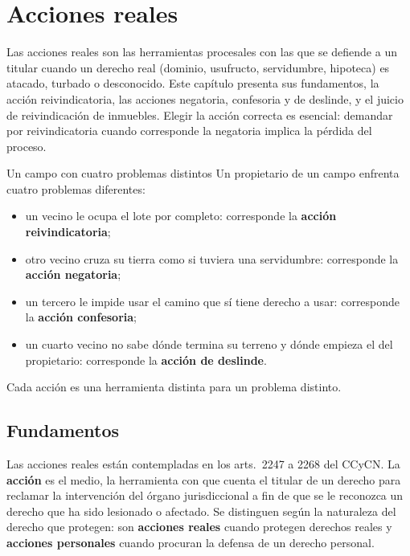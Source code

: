 \documentclass[12pt,oneside]{book}
\begin{document}
\chapter{Acciones reales}\label{cap:reales}

Las acciones reales son las herramientas procesales con las que se defiende a un titular cuando un derecho real (dominio, usufructo, servidumbre, hipoteca) es atacado, turbado o desconocido. Este capítulo presenta sus fundamentos, la acción reivindicatoria, las acciones negatoria, confesoria y de deslinde, y el juicio de reivindicación de inmuebles. Elegir la acción correcta es esencial: demandar por reivindicatoria cuando corresponde la negatoria implica la pérdida del proceso.

\begin{ejemplo}{Un campo con cuatro problemas distintos}
Un propietario de un campo enfrenta cuatro problemas diferentes:
\begin{itemize}
    \item un vecino le ocupa el lote por completo: corresponde la \textbf{acción reivindicatoria};
    \item otro vecino cruza su tierra como si tuviera una servidumbre: corresponde la \textbf{acción negatoria};
    \item un tercero le impide usar el camino que sí tiene derecho a usar: corresponde la \textbf{acción confesoria};
    \item un cuarto vecino no sabe dónde termina su terreno y dónde empieza el del propietario: corresponde la \textbf{acción de deslinde}.
\end{itemize}
Cada acción es una herramienta distinta para un problema distinto.
\end{ejemplo}

\section{Fundamentos}

Las acciones reales están contempladas en los arts.~2247 a 2268 del CCyCN. La \textbf{acción} es el medio, la herramienta con que cuenta el titular de un derecho para reclamar la intervención del órgano jurisdiccional a fin de que se le reconozca un derecho que ha sido lesionado o afectado. Se distinguen según la naturaleza del derecho que protegen: son \textbf{acciones reales} cuando protegen derechos reales y \textbf{acciones personales} cuando procuran la defensa de un derecho personal.
\end{document}
